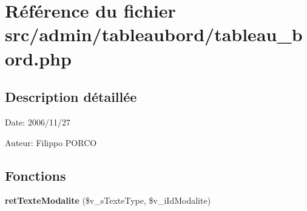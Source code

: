 \section{Référence du fichier src/admin/tableaubord/tableau\_\-bord.php}
\label{tableau__bord_8php}


\subsection{Description détaillée}
\begin{Desc}
\item[Date:]2006/11/27\end{Desc}
\begin{Desc}
\item[Auteur:]Filippo PORCO \end{Desc}


\subsection*{Fonctions}
\begin{CompactItemize}
\item 
\textbf{retTexteModalite} (\$v\_\-sTexteType, \$v\_\-iIdModalite)\label{tableau__bord_8php_6f6f71d52ad2e0533620aa3234c319a2}

\end{CompactItemize}
